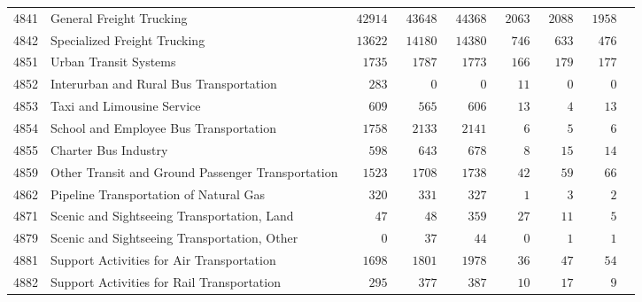 \documentclass[9pt, oneside]{article}   	%
\begin{document}
\begin{longtable}{lp{3 in}ccccccc}
4841  & General Freight Trucking & $\phantom{0}42914$ & $\phantom{0}43648$ & $\phantom{0}44368$ & $\phantom{0}2063$ & $\phantom{0}2088$ & $\phantom{0}1958$ \\
4842  & Specialized Freight Trucking & $\phantom{0}13622$ & $\phantom{0}14180$ & $\phantom{0}14380$ & $\phantom{00}746$ & $\phantom{00}633$ & $\phantom{00}476$ \\

4851  & Urban Transit Systems & $\phantom{00}1735$ & $\phantom{00}1787$ & $\phantom{00}1773$ & $\phantom{00}166$ & $\phantom{00}179$ & $\phantom{00}177$ \\
4852  & Interurban and Rural Bus Transportation & $\phantom{000}283$ & $\phantom{00000}0$ & $\phantom{00000}0$ & $\phantom{000}11$ & $\phantom{0000}0$ & $\phantom{0000}0$ \\
4853  & Taxi and Limousine Service & $\phantom{000}609$ & $\phantom{000}565$ & $\phantom{000}606$ & $\phantom{000}13$ & $\phantom{0000}4$ & $\phantom{000}13$ \\
4854  & School and Employee Bus Transportation & $\phantom{00}1758$ & $\phantom{00}2133$ & $\phantom{00}2141$ & $\phantom{0000}6$ & $\phantom{0000}5$ & $\phantom{0000}6$ \\
4855  & Charter Bus Industry & $\phantom{000}598$ & $\phantom{000}643$ & $\phantom{000}678$ & $\phantom{0000}8$ & $\phantom{000}15$ & $\phantom{000}14$ \\
4859  & Other Transit and Ground Passenger Transportation & $\phantom{00}1523$ & $\phantom{00}1708$ & $\phantom{00}1738$ & $\phantom{000}42$ & $\phantom{000}59$ & $\phantom{000}66$ \\
4862  & Pipeline Transportation of Natural Gas & $\phantom{000}320$ & $\phantom{000}331$ & $\phantom{000}327$ & $\phantom{0000}1$ & $\phantom{0000}3$ & $\phantom{0000}2$ \\
4871  & Scenic and Sightseeing Transportation, Land & $\phantom{0000}47$ & $\phantom{0000}48$ & $\phantom{000}359$ & $\phantom{000}27$ & $\phantom{000}11$ & $\phantom{0000}5$ \\
4879  & Scenic and Sightseeing Transportation, Other & $\phantom{00000}0$ & $\phantom{0000}37$ & $\phantom{0000}44$ & $\phantom{0000}0$ & $\phantom{0000}1$ & $\phantom{0000}1$ \\
4881  & Support Activities for Air Transportation & $\phantom{00}1698$ & $\phantom{00}1801$ & $\phantom{00}1978$ & $\phantom{000}36$ & $\phantom{000}47$ & $\phantom{000}54$ \\
4882  & Support Activities for Rail Transportation & $\phantom{000}295$ & $\phantom{000}377$ & $\phantom{000}387$ & $\phantom{000}10$ & $\phantom{000}17$ & $\phantom{0000}9$ \\

\end{longtable}
\end{document}
